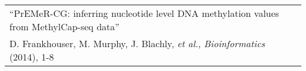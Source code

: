 \begin{tabularx}{\textwidth}{ X }
  ``PrEMeR-CG: inferring nucleotide level DNA methylation values from MethylCap-seq data'' \\
  \small{D. Frankhouser, M. Murphy, J. Blachly, \textit{et al.}, \textit{Bioinformatics} (2014), 1-8} \\
\end{tabularx}
